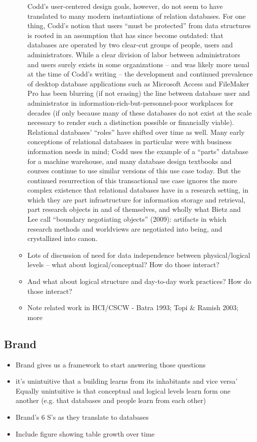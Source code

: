 \begin{itemize}
\begin{itemize}
Codd’s user-centered design goals, however, do not seem to have translated to many modern instantiations of relation databases. For one thing, Codd’s notion that users “must be protected” from data structures is rooted in an assumption that has since become outdated: that databases are operated by two clear-cut groups of people, users and administrators.  While a clear division of labor between administrators and users surely exists in some organizations – and was likely more usual at the time of Codd’s writing – the development and continued prevalence of desktop database applications such as Microsoft Access and FileMaker Pro has been blurring (if not erasing) the line between database user and administrator in information-rich-but-personnel-poor workplaces for decades (if only because many of these databases do not exist at the scale necessary to render such a distinction possible or financially viable). 
Relational databases’ “roles” have shifted over time as well. Many early conceptions of relational databases in particular were with business information needs in mind; Codd uses the example of a “parts” database for a machine warehouse, and many database design textbooks and courses continue to use similar versions of this use case today.  But the continued resurrection of this transactional use case ignores the more complex existence that relational databases have in a research setting, in which they are part infrastructure for information storage and retrieval, part research objects in and of themselves, and wholly what Bietz and Lee call “boundary negotiating objects” (2009): artifacts in which research methods and worldviews are negotiated into being, and crystallized into canon.  

\item Lots of discussion of need for data independence between physical/logical levels – what about logical/conceptual? How do those interact?
\item And what about logical structure and day-to-day work practices? How do those interact?
\item Note related work in HCI/CSCW - Batra 1993; Topi & Ramish 2003; more
\end{itemize}
\end{itemize}

\subsection{Brand}

\begin{itemize}
\item Brand gives us a framework to start answering those questions
\item	it's unintuitive that a building learns from its inhabitants and vice versa’ Equally unintuitive is that conceptual and logical levels learn form one another (e.g. that databases and people learn from each other)
\item Brand’s 6 S’s as they translate to databases
\item Include figure showing table growth over time
\end{itemize}

